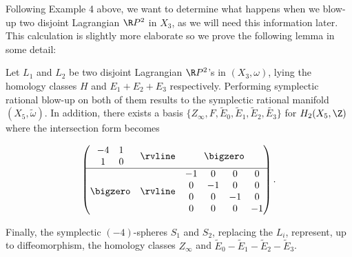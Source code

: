 Following Example 4 above, we want to determine what happens when we blow-up two disjoint Lagrangian $\R P^2$ in $X_3$, as we will need this information later. This calculation is slightly more elaborate so we prove the following lemma in some detail:

\begin{lemma}\label{existbasislemma}
Let $L_1$ and $L_2$ be two disjoint Lagrangian $\R P^2$'s in $(X_3,\omega)$, lying the homology classes $H$ and $E_1+E_2+E_3$ respectively. Performing symplectic rational blow-up on both of them results to the symplectic rational manifold $(X_5,\tilde{\omega})$. In addition, there exists a basis $\{Z_\infty,F,\widetilde{E}_0,\widetilde{E}_1,\widetilde{E}_2,\widetilde{E_3}\}$ for $H_2(X_5,\Z)$ where the intersection form becomes 

\[
\begin{pmatrix}
  \begin{matrix}
  -4 & 1 \\
  1 & 0
  \end{matrix}
  & \rvline & \bigzero \\
\hline
  \bigzero & \rvline &
  \begin{matrix}
  -1 & 0 & 0 & 0 \\
  0 & -1 & 0 & 0 \\
  0 & 0 & -1 & 0 \\
  0 & 0 & 0 & -1
  \end{matrix}
\end{pmatrix}
.\]





    







Finally, the symplectic $(-4)$-spheres $S_1$ and $S_2$, replacing the $L_i$, represent, up to diffeomorphism, the homology classes $Z_\infty$ and $\widetilde{E}_0-\widetilde{E}_1-\widetilde{E}_2-\widetilde{E}_3$.
\end{lemma}

